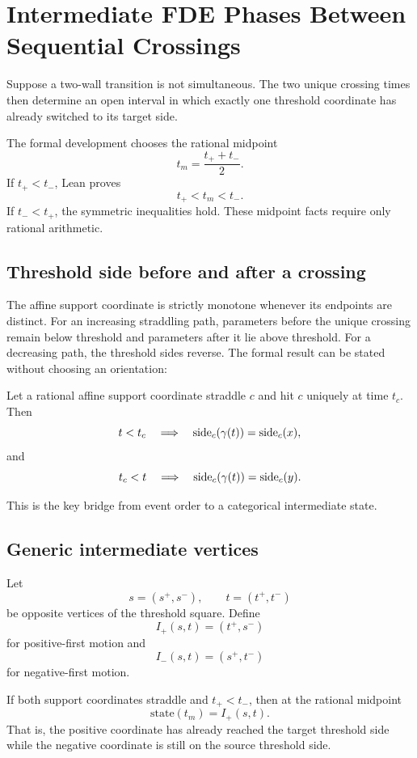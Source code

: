 \section{Intermediate FDE Phases Between Sequential Crossings}
\label{sec:intermediate}

Suppose a two-wall transition is not simultaneous. The two unique crossing times then determine an open interval in which exactly one threshold coordinate has already switched to its target side.

The formal development chooses the rational midpoint
\[
  t_m=\frac{t_++t_-}{2}.
\]
If \(t_+<t_-\), Lean proves
\[
  t_+<t_m<t_-.
\]
If \(t_-<t_+\), the symmetric inequalities hold. These midpoint facts require only rational arithmetic.

\subsection{Threshold side before and after a crossing}

The affine support coordinate is strictly monotone whenever its endpoints are distinct. For an increasing straddling path, parameters before the unique crossing remain below threshold and parameters after it lie above threshold. For a decreasing path, the threshold sides reverse. The formal result can be stated without choosing an orientation:

\begin{proposition}
Let a rational affine support coordinate straddle \(c\) and hit \(c\) uniquely at time \(t_c\). Then
\[
  t<t_c
  \quad\Longrightarrow\quad
  \operatorname{side}_c(\gamma(t))=\operatorname{side}_c(x),
\]
and
\[
  t_c<t
  \quad\Longrightarrow\quad
  \operatorname{side}_c(\gamma(t))=\operatorname{side}_c(y).
\]
\statusverified
\end{proposition}

This is the key bridge from event order to a categorical intermediate state.

\subsection{Generic intermediate vertices}

Let
\[
  s=(s^+,s^-),
  \qquad
  t=(t^+,t^-)
\]
be opposite vertices of the threshold square. Define
\[
  I_+(s,t)=(t^+,s^-)
\]
for positive-first motion and
\[
  I_-(s,t)=(s^+,t^-)
\]
for negative-first motion.

\begin{theorem}
If both support coordinates straddle and \(t_+<t_-\), then at the rational midpoint
\[
  \text{state}(t_m)=I_+(s,t).
\]
That is, the positive coordinate has already reached the target threshold side while the negative coordinate is still on the source threshold side.
\statusverified
\end{theorem}

